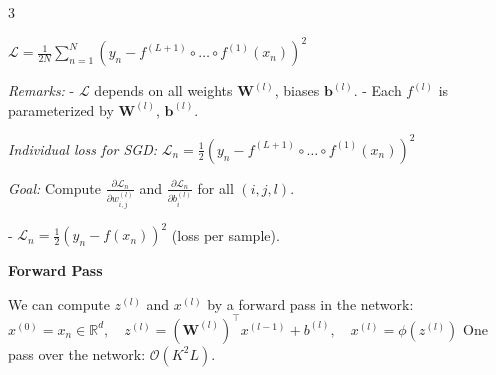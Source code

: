 \documentclass[landscape, 10pt]{article}
\begin{document}
\begin{multicols*}{3}
{$
\mathcal{L} = \frac{1}{2N} \sum_{n=1}^N \left(y_n - f^{(L+1)} \circ \dots \circ f^{(1)}(x_n)\right)^2
$

\textit{Remarks:}  
- $\mathcal{L}$ depends on all weights $\mathbf{W}^{(l)}$, biases $\mathbf{b}^{(l)}$.  
- Each $f^{(l)}$ is parameterized by $\mathbf{W}^{(l)}$, $\mathbf{b}^{(l)}$.  

\textit{Individual loss for SGD:}  
$
\mathcal{L}_n = \frac{1}{2} \left(y_n - f^{(L+1)} \circ \dots \circ f^{(1)}(x_n)\right)^2
$

\textit{Goal:} Compute $\frac{\partial \mathcal{L}_n}{\partial w_{i,j}^{(l)}}$ and $\frac{\partial \mathcal{L}_n}{\partial b_i^{(l)}}$ for all $(i,j,l)$.  


- $\mathcal{L}_n = \frac{1}{2}(y_n - f(x_n))^2$ (loss per sample).  

\textbf{Forward Pass}

We can compute $z^{(l)}$ and $x^{(l)}$ by a forward pass in the network:
$
x^{(0)} = x_n \in \mathbb{R}^d, \quad z^{(l)} = (\mathbf{W}^{(l)})^\top x^{(l-1)} + b^{(l)}, \quad x^{(l)} = \phi(z^{(l)})
$
One pass over the network: $\mathcal{O}(K^2L)$.

}


\end{multicols*}
\end{document}
